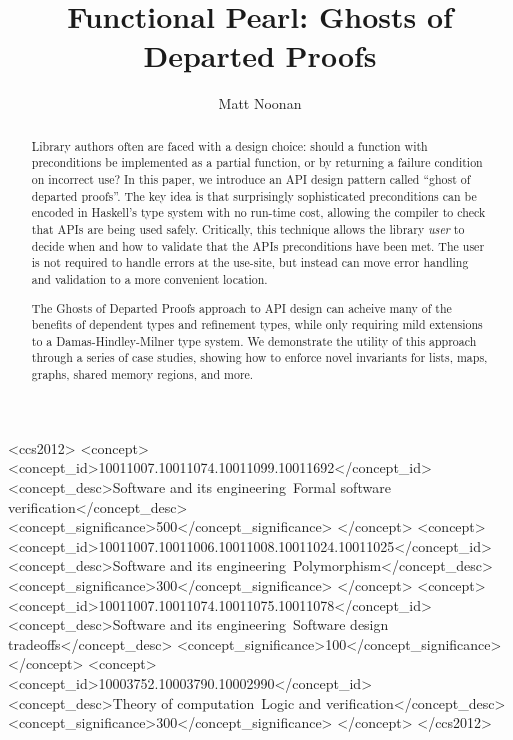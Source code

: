 \documentclass[format=sigplan, review=false, screen=true]{acmart}
\begin{document}
\title[Ghosts of Departed Proofs]{Functional Pearl: Ghosts of Departed Proofs}

\author{Matt Noonan}


\begin{abstract}

  Library authors often are faced with a design choice: should a function with
  preconditions be implemented as a partial function, or by returning a failure
  condition on incorrect use?
  In this paper, we introduce an API design pattern called ``ghost of departed
  proofs''. The key idea is that surprisingly sophisticated preconditions can be
  encoded in Haskell's type system with no run-time cost, allowing the compiler
  to check that APIs are being used safely. Critically, this technique allows the
  library \emph{user} to decide when and how to validate that the APIs preconditions
  have been met. The user is not required to handle errors at the use-site, but instead
  can move error handling and validation to a more convenient location.

  The Ghosts of Departed Proofs approach to API design can acheive many of the benefits
  of dependent types and refinement types, while only requiring mild extensions to
  a Damas-Hindley-Milner type system. We demonstrate the utility of this approach
  through a series of case studies, showing how to enforce novel invariants for lists,
  maps, graphs, shared memory regions, and more.
\end{abstract}


%
%
 \begin{CCSXML}
<ccs2012>
<concept>
<concept_id>10011007.10011074.10011099.10011692</concept_id>
<concept_desc>Software and its engineering~Formal software verification</concept_desc>
<concept_significance>500</concept_significance>
</concept>
<concept>
<concept_id>10011007.10011006.10011008.10011024.10011025</concept_id>
<concept_desc>Software and its engineering~Polymorphism</concept_desc>
<concept_significance>300</concept_significance>
</concept>
<concept>
<concept_id>10011007.10011074.10011075.10011078</concept_id>
<concept_desc>Software and its engineering~Software design tradeoffs</concept_desc>
<concept_significance>100</concept_significance>
</concept>
<concept>
<concept_id>10003752.10003790.10002990</concept_id>
<concept_desc>Theory of computation~Logic and verification</concept_desc>
<concept_significance>300</concept_significance>
</concept>
</ccs2012>
\end{CCSXML}
\end{document}
